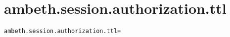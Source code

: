 \section{ambeth.session.authorization.ttl}
\label{configuration:AmbethSessionAuthorizationTtl}
\ClearAPI
\TODO%
\begin{lstlisting}[style=Props,caption={Usage example for \textit{ambeth.session.authorization.ttl}}]
ambeth.session.authorization.ttl=
\end{lstlisting}